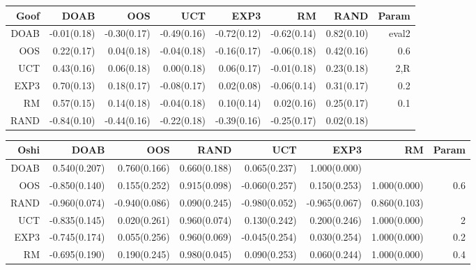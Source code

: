 \begin{figure}
\begin{tiny}

\begin{tabular}{|r|rrrrrr|r|}\hline
Goof&DOAB&OOS&UCT&EXP3&RM&RAND&Param\\\hline
DOAB&-0.01(0.18)&-0.30(0.17)&-0.49(0.16)&-0.72(0.12)&-0.62(0.14)&0.82(0.10)&eval2\\
OOS&0.22(0.17)&0.04(0.18)&-0.04(0.18)&-0.16(0.17)&-0.06(0.18)&0.42(0.16)&0.6\\
UCT&0.43(0.16)&0.06(0.18)&0.00(0.18)&0.06(0.17)&-0.01(0.18)&0.23(0.18)&2,R\\
EXP3&0.70(0.13)&0.18(0.17)&-0.08(0.17)&0.02(0.08)&-0.06(0.14)&0.31(0.17)&0.2\\
RM&0.57(0.15)&0.14(0.18)&-0.04(0.18)&0.10(0.14)&0.02(0.16)&0.25(0.17)&0.1\\
RAND&-0.84(0.10)&-0.44(0.16)&-0.22(0.18)&-0.39(0.16)&-0.25(0.17)&0.02(0.18)&\\
\hline
\end{tabular}


\begin{tabular}{|r|rrrrrr|r|}\hline
Oshi&DOAB&OOS&RAND&UCT&EXP3&RM&Param\\\hline
DOAB&0.540(0.207)&0.760(0.166)&0.660(0.188)&0.065(0.237)&1.000(0.000)&&\\
OOS&-0.850(0.140)&0.155(0.252)&0.915(0.098)&-0.060(0.257)&0.150(0.253)&1.000(0.000)&0.6\\
RAND&-0.960(0.074)&-0.940(0.086)&0.090(0.245)&-0.980(0.052)&-0.965(0.067)&0.860(0.103)&\\
UCT&-0.835(0.145)&0.020(0.261)&0.960(0.074)&0.130(0.242)&0.200(0.246)&1.000(0.000)&2\\
EXP3&-0.745(0.174)&0.055(0.256)&0.960(0.069)&-0.045(0.254)&0.030(0.254)&1.000(0.000)&0.2\\
RM&-0.695(0.190)&0.190(0.245)&0.980(0.045)&0.090(0.253)&0.060(0.244)&1.000(0.000)&0.4\\\hline
\end{tabular}



\end{tiny}
\end{figure}
